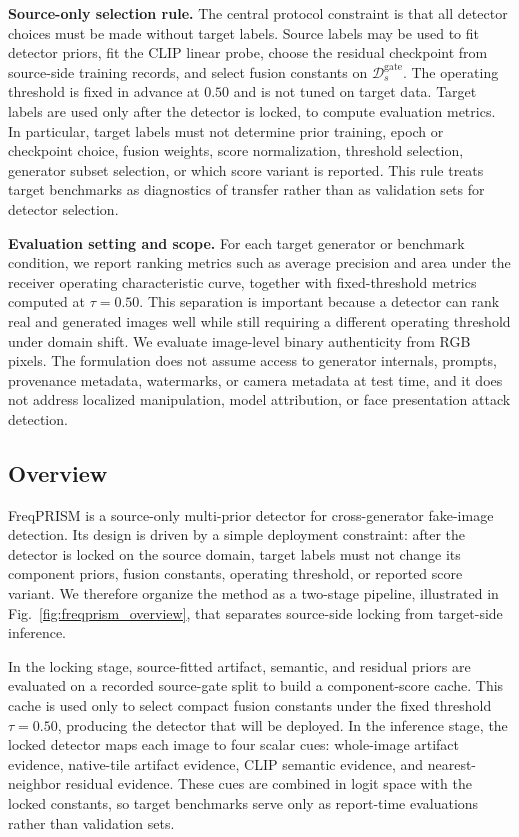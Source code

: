 \documentclass[lettersize,journal]{IEEEtran}
\begin{document}
\textbf{Source-only selection rule.}
The central protocol constraint is that all detector choices must be made without target labels. Source labels may be used to fit detector priors, fit the CLIP linear probe, choose the residual checkpoint from source-side training records, and select fusion constants on $\mathcal{D}_{s}^{\mathrm{gate}}$. The operating threshold is fixed in advance at $0.50$ and is not tuned on target data. Target labels are used only after the detector is locked, to compute evaluation metrics. In particular, target labels must not determine prior training, epoch or checkpoint choice, fusion weights, score normalization, threshold selection, generator subset selection, or which score variant is reported. This rule treats target benchmarks as diagnostics of transfer rather than as validation sets for detector selection.

\textbf{Evaluation setting and scope.}
For each target generator or benchmark condition, we report ranking metrics such as average precision and area under the receiver operating characteristic curve, together with fixed-threshold metrics computed at $\tau=0.50$. This separation is important because a detector can rank real and generated images well while still requiring a different operating threshold under domain shift. We evaluate image-level binary authenticity from RGB pixels. The formulation does not assume access to generator internals, prompts, provenance metadata, watermarks, or camera metadata at test time, and it does not address localized manipulation, model attribution, or face presentation attack detection.

\subsection{Overview}
\label{sec:method_overview}

FreqPRISM is a source-only multi-prior detector for cross-generator fake-image detection. Its design is driven by a simple deployment constraint: after the detector is locked on the source domain, target labels must not change its component priors, fusion constants, operating threshold, or reported score variant. We therefore organize the method as a two-stage pipeline, illustrated in Fig.~\ref{fig:freqprism_overview}, that separates source-side locking from target-side inference.

In the locking stage, source-fitted artifact, semantic, and residual priors are evaluated on a recorded source-gate split to build a component-score cache. This cache is used only to select compact fusion constants under the fixed threshold $\tau=0.50$, producing the detector that will be deployed. In the inference stage, the locked detector maps each image to four scalar cues: whole-image artifact evidence, native-tile artifact evidence, CLIP semantic evidence, and nearest-neighbor residual evidence. These cues are combined in logit space with the locked constants, so target benchmarks serve only as report-time evaluations rather than validation sets.
\end{document}
